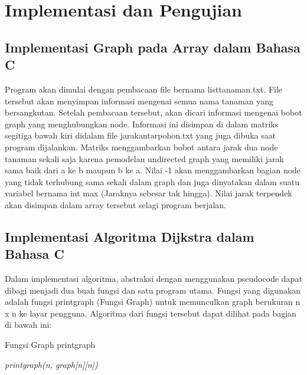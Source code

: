 \documentclass [conference] {IEEEtran}
\begin{document}
\section{Implementasi dan Pengujian}
\subsection{Implementasi Graph pada Array dalam Bahasa C}
Program akan dimulai dengan pembacaan file bernama listtanaman.txt. File tersebut akan menyimpan informasi mengenai semua nama tanaman yang bersangkutan. Setelah pembacaan tersebut, akan dicari informasi mengenai bobot graph yang menghubungkan node. Informasi ini disimpan di dalam matriks segitiga bawah kiri didalam file jarakantarpohon.txt yang juga dibuka saat program dijalankan. Matriks menggambarkan bobot antara jarak dua node tanaman sekali saja karena pemodelan undirected graph yang memiliki jarak sama baik dari a ke b maupun b ke a. Nilai -1 akan menggambarkan bagian node yang tidak terhubung sama sekali dalam graph dan juga dinyatakan dalam suatu variabel bernama int max (Jaraknya sebesar tak hingga). Nilai jarak terpendek akan disimpan dalam array tersebut selagi program berjalan.
\subsection{Implementasi Algoritma Dijkstra dalam Bahasa C}
Dalam implementasi algoritma, abstraksi dengan menggunakan pseudocode dapat dibagi menjadi dua buah fungsi dan satu program utama. Fungsi yang digunakan adalah fungsi printgraph (Fungsi Graph) untuk memunculkan graph berukuran n x n ke layar pengguna. Algoritma dari fungsi tersebut dapat dilihat pada bagian di bawah ini:
\begin{algorithm}
\caption{Fungsi Graph {\selectfont printgraph}}\label{alg:two}
 \textit{printgraph(n, graph[n][n])}\;
\end{algorithm}
\end{document}
